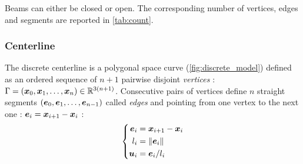 Beams can either be closed or open. The corresponding number of vertices, edges and segments are reported in \cref{tab:count}.

\subsubsection{Centerline}

The discrete centerline is a polygonal space curve (\cref{fig:discrete_model}) defined as an ordered sequence of $n+1$ pairwise disjoint \emph{vertices} : $\Gamma = (\boldsymbol{x}_0,  \boldsymbol{x}_1, \ldots, \boldsymbol{x}_n) \in \mathbb{R}^{3(n+1)}$. Consecutive pairs of vertices define $n$ straight segments $(\boldsymbol{e}_0,  \boldsymbol{e}_1, \ldots, \boldsymbol{e}_{n-1})$ called \emph{edges} and pointing from one vertex to the next one : $\boldsymbol{e}_i = \boldsymbol{x}_{i+1} - \boldsymbol{x}_{i}$ : 
\begin{equation}
	\left\{
	\begin{aligned}
		\boldsymbol{e}_i 	&= \boldsymbol{x}_{i+1} - \boldsymbol{x}_{i} \\
		l_i 		&= \lVert\boldsymbol{e}_i\rVert \\
		\boldsymbol{u}_i 	&= \boldsymbol{e}_i / l_i\\
	\end{aligned}
	\right.
\end{equation}

